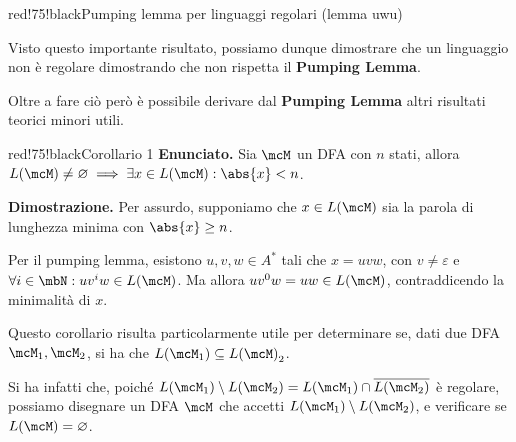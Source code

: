 \begin{halfframedbox}{red!75!black}{Pumping lemma per linguaggi regolari (lemma uwu)}
\begin{center}
  \end{center}

\end{halfframedbox}

Visto questo importante risultato, possiamo dunque dimostrare che un linguaggio non è regolare dimostrando che non rispetta il \textbf{Pumping Lemma}.

Oltre a fare ciò però è possibile derivare dal \textbf{Pumping Lemma} altri risultati teorici minori utili.

\begin{halfframedbox}{red!75!black}{Corollario 1}
  \textbf{Enunciato. } Sia \(\mcM\) un DFA con \(n\) stati, allora \(L(\mcM) \neq \varnothing \implies \exists x \in L(\mcM): \abs{x} < n\).

  \begin{center}
    \textcolor{red!75!black}{\hdashrule[0.5ex]{18cm}{1pt}{3mm 3pt 1mm 2pt}}
  \end{center}

  \textbf{Dimostrazione. } Per assurdo, supponiamo che \(x \in L(\mcM)\) sia la parola di lunghezza minima con \(\abs{x} \geq n\).

  Per il pumping lemma, esistono \(u,v,w \in A^*\) tali che \(x=uvw\), con \(v \neq \varepsilon\) e \(\forall i \in \mbN: uv^{i}w \in L(\mcM)\). Ma allora \(uv^0w=uw \in L(\mcM)\), contraddicendo la minimalità di \(x\).

\end{halfframedbox}

Questo corollario risulta particolarmente utile per determinare se, dati due DFA \(\mcM_1, \mcM_2\), si ha che \(L(\mcM_1) \subseteq L{(\mcM)}_2\).

Si ha infatti che, poiché \(L(\mcM_1) \setminus L(\mcM_2) = L(\mcM_1) \cap \overline{L(\mcM_2)}\)  è regolare, possiamo disegnare un DFA \(\mcM\) che accetti \(L(\mcM_1) \setminus L(\mcM_2)\), e verificare se \(L(\mcM)=\varnothing\).

